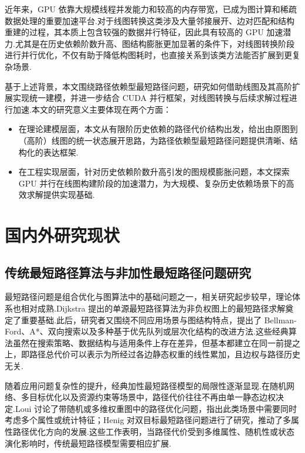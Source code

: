 近年来，GPU 依靠大规模线程并发能力和较高的内存带宽，已成为图计算和稀疏数据处理的重要加速平台.对于线图转换这类涉及大量邻接展开、边对匹配和结构重建的过程，其本质上包含较强的数据并行特征，因此具有较高的 GPU 加速潜力.尤其是在历史依赖阶数升高、图结构膨胀更加显著的条件下，对线图转换阶段进行并行优化，不仅有助于降低构图耗时，也直接关系到该类方法能否扩展到更复杂场景.

基于上述背景，本文围绕路径依赖型最短路径问题，研究如何借助线图及其高阶扩展实现统一建模，并进一步结合 CUDA 并行框架，对线图转换与后续求解过程进行加速.本文的研究意义主要体现在两个方面：
\begin{itemize}
	\item 在理论建模层面，本文从有限阶历史依赖的路径代价结构出发，给出由原图到（高阶）线图的统一状态展开思路，为路径依赖型最短路径问题提供清晰、结构化的表达框架.
	\item 在工程实现层面，针对历史依赖阶数升高引发的图规模膨胀问题，本文探索 GPU 并行在线图构建阶段的加速潜力，为大规模、复杂历史依赖场景下的高效求解提供实现基础.
\end{itemize}


\section{国内外研究现状}

\subsection{传统最短路径算法与非加性最短路径问题研究}

最短路径问题是组合优化与图算法中的基础问题之一，相关研究起步较早，理论体系也相对成熟.Dijkstra 提出的单源最短路径算法为非负权图上的最短路径求解奠定了重要基础\cite{dijkstra1959note}.此后，研究者又围绕不同应用场景与图结构特点，提出了 Bellman-Ford、A*、双向搜索以及多种基于优先队列或层次化结构的改进方法.这些经典算法虽然在搜索策略、数据结构与适用条件上存在差异，但基本都建立在同一前提之上，即路径总代价可以表示为所经过各边静态权重的线性累加，且边权与路径历史无关.

随着应用问题复杂性的提升，经典加性最短路径模型的局限性逐渐显现.在随机网络、多目标优化以及资源约束等场景中，路径代价往往不再由单一静态边权决定.Loui 讨论了带随机或多维权重图中的路径优化问题，指出此类场景中需要同时考虑多个属性或统计特征\cite{loui1983optimal}；Henig 对双目标最短路径问题进行了研究，推动了多属性路径优化方向的发展\cite{henig1986shortest}.这些工作表明，当路径代价受到多维属性、随机性或状态演化影响时，传统最短路径模型需要相应扩展.

